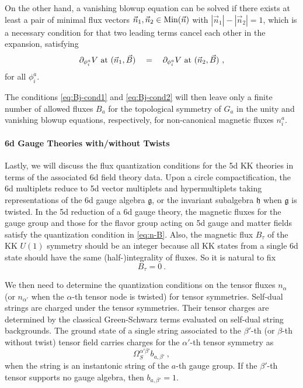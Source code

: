 On the other hand, a vanishing blowup equation can be solved if there exists at least a pair of minimal flux vectors $\vec{n}_1,\vec{n}_2\in {\rm Min}(\vec{n})$ with $|\vec{n}_1|-|\vec{n}_2| = 1$, which is a necessary condition for that two leading terms cancel each other in the expansion, satisfying
\begin{equation}\label{eq:Bj-cond2}
	\partial_{\phi^a_i}V \ {\rm at} \ (\vec{n}_1 , \vec{B}) \quad = \quad 
	\partial_{\phi^a_i} V \ {\rm at} \ (\vec{n}_2, \vec{B}) \ ,
\end{equation}
for all $\phi_i^a$.

The conditions \eqref{eq:Bj-cond1} and \eqref{eq:Bj-cond2} will then leave only a finite number of allowed fluxes $B_a$ for the topological symmetry of $G_a$ in the unity and  vanishing blowup equations, respectively, for non-canonical magnetic fluxes $n^a_i$.


\paragraph{6d Gauge Theories with/without Twists}
Lastly, we will discuss the flux quantization conditions for the 5d KK theories in terms of the associated 6d field theory data. Upon a circle compactification, the 6d multiplets reduce to 5d vector multiplets and hypermultiplets taking representations of the 6d gauge algebra $\mathfrak{g}$, or the invariant subalgebra $\mathfrak{h}$ when $\mathfrak{g}$ is twisted. In the 5d reduction of a 6d gauge theory, the magnetic fluxes for the gauge group and those for the flavor group acting on 5d gauge and matter fields satisfy the quantization condition in \eqref{eq:n-B}. Also, the magnetic flux $B_\tau$ of the KK $U(1)$ symmetry should be an integer because all KK states from a single 6d state should have the same (half-)integrality of fluxes. So it is natural to fix
\begin{equation}
	B_\tau = 0 \ .
\end{equation}

We then need to determine the quantization conditions on the tensor fluxes $n_{\alpha}$ (or $n_{\alpha'}$ when the $\alpha$-th tensor node is twisted) for tensor symmetries. Self-dual strings are charged under the tensor symmetries. Their tensor charges are determined by the classical Green-Schwarz terms evaluated on self-dual string backgrounds. The ground state of a single string associated to the $\beta'$-th (or $\beta$-th without twist) tensor field carries charges for the $\alpha'$-th tensor symmetry as
\begin{equation}
	\Omega^{\alpha'\beta'}_S b_{a,\beta'} \ ,
\end{equation}
when the string is an instantonic string of the $a$-th gauge group. If the $\beta'$-th tensor supports no gauge algebra, then $b_{a,\beta'}=1$. 

